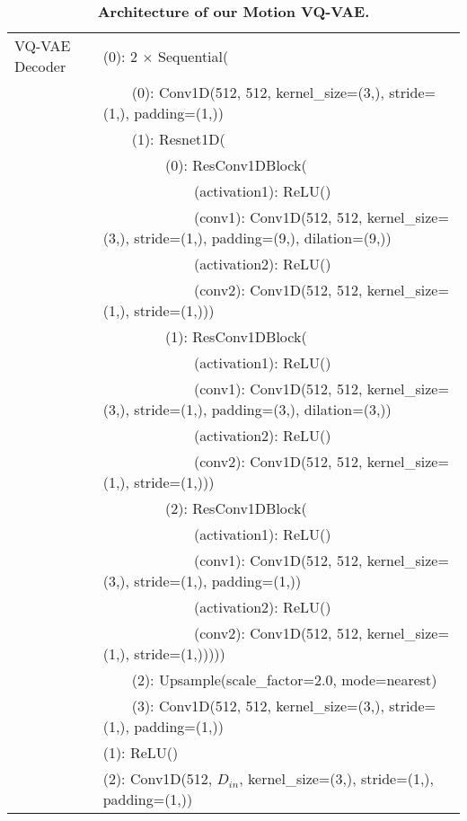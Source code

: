 \documentclass[10pt,twocolumn,letterpaper]{article}
\begin{document}
\begin{table*}[h]
\begin{tabular}{ll}
        \midrule
        VQ-VAE Decoder & (0): 2 $\times$ Sequential( \\
        ~ &   ~~~~(0): Conv1D(512, 512, kernel\_size=(3,), stride=(1,), padding=(1,)) \\
        ~ &   ~~~~(1): Resnet1D( \\
        ~ &   ~~~~~~~~    (0): ResConv1DBlock( \\
        ~ &   ~~~~~~~~~~~~      (activation1): ReLU() \\
        ~ &   ~~~~~~~~~~~~      (conv1): Conv1D(512, 512, kernel\_size=(3,), stride=(1,), padding=(9,), dilation=(9,)) \\
        ~ &   ~~~~~~~~~~~~      (activation2): ReLU() \\
        ~ &   ~~~~~~~~~~~~      (conv2): Conv1D(512, 512, kernel\_size=(1,), stride=(1,))) \\
        ~ &   ~~~~~~~~    (1): ResConv1DBlock( \\
        ~ &   ~~~~~~~~~~~~      (activation1): ReLU() \\
        ~ &    ~~~~~~~~~~~~     (conv1): Conv1D(512, 512, kernel\_size=(3,), stride=(1,), padding=(3,), dilation=(3,)) \\
        ~ &   ~~~~~~~~~~~~      (activation2): ReLU() \\
        ~ &    ~~~~~~~~~~~~     (conv2): Conv1D(512, 512, kernel\_size=(1,), stride=(1,))) \\
        ~ &   ~~~~~~~~    (2): ResConv1DBlock( \\
        ~ &   ~~~~~~~~~~~~      (activation1): ReLU() \\
        ~ &   ~~~~~~~~~~~~      (conv1): Conv1D(512, 512, kernel\_size=(3,), stride=(1,), padding=(1,)) \\
        ~ &   ~~~~~~~~~~~~      (activation2): ReLU() \\
        ~ &   ~~~~~~~~~~~~      (conv2): Conv1D(512, 512, kernel\_size=(1,), stride=(1,))))) \\
        ~ &   ~~~~(2): Upsample(scale\_factor=2.0, mode=nearest) \\
        ~ &   ~~~~(3): Conv1D(512, 512, kernel\_size=(3,), stride=(1,), padding=(1,)) \\
        ~ & (1): ReLU() \\
        ~ & (2): Conv1D(512, $D_{in}$, kernel\_size=(3,), stride=(1,), padding=(1,))
 \\
         \bottomrule
    \end{tabular}
    \caption{\textbf{Architecture of our Motion VQ-VAE.}}
    \label{tab:supp_vqarch}
\end{table*} 
\end{document}
